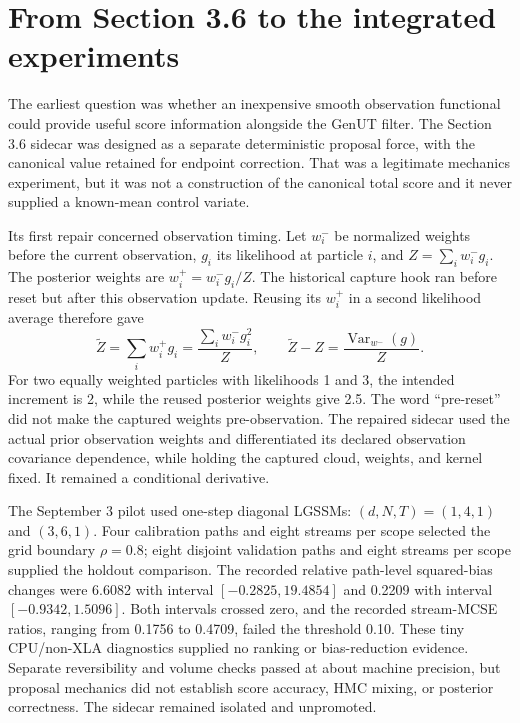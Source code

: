 \section{From Section 3.6 to the integrated experiments}
\label{sec:history}

The earliest question was whether an inexpensive smooth observation
functional could provide useful score information alongside the GenUT
filter. The Section 3.6 sidecar was designed as a separate deterministic
proposal force, with the canonical value retained for endpoint correction.
That was a legitimate mechanics experiment, but it was not a construction of
the canonical total score and it never supplied a known-mean control variate.

Its first repair concerned observation timing. Let $w_i^-$ be normalized
weights before the current observation, $g_i$ its likelihood at particle $i$,
and $Z=\sum_i w_i^-g_i$. The posterior weights are $w_i^+=w_i^-g_i/Z$.
The historical capture hook ran before reset but after this observation
update. Reusing its $w_i^+$ in a second likelihood average therefore gave
\begin{equation}
 \widetilde Z=\sum_iw_i^+g_i
 =\frac{\sum_iw_i^-g_i^2}{Z},\qquad
 \widetilde Z-Z=\frac{\operatorname{Var}_{w^-}(g)}{Z}.
 \label{eq:historical-double-observation}
\end{equation}
For two equally weighted particles with likelihoods 1 and 3, the intended
increment is 2, while the reused posterior weights give 2.5. The word
``pre-reset'' did not make the captured weights pre-observation. The repaired
sidecar used the actual prior observation weights and differentiated its
declared observation covariance dependence, while holding the captured cloud,
weights, and kernel fixed. It remained a conditional derivative.

The September 3 pilot used one-step diagonal LGSSMs: $(d,N,T)=(1,4,1)$ and
$(3,6,1)$. Four calibration paths and eight streams per scope selected the
grid boundary $\rho=0.8$; eight disjoint validation paths and eight streams
per scope supplied the holdout comparison. The recorded relative
path-level squared-bias changes were 6.6082 with interval
$[-0.2825,19.4854]$ and 0.2209 with interval $[-0.9342,1.5096]$.
Both intervals crossed zero, and the recorded stream-MCSE ratios, ranging
from 0.1756 to 0.4709, failed the threshold 0.10. These tiny CPU/non-XLA
diagnostics supplied no ranking or bias-reduction evidence. Separate
reversibility and volume checks passed at about machine precision, but
proposal mechanics did not establish score accuracy, HMC mixing, or posterior
correctness. The sidecar remained isolated and unpromoted.

